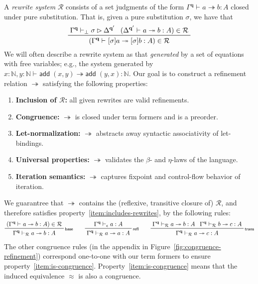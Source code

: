 \documentclass[acmsmall,screen,review]{acmart}
\newcommand{\mc}[1]{\ensuremath{\mathcal{#1}}}
\newcommand{\mb}[1]{\ensuremath{\mathbf{#1}}}
\newcommand{\ms}[1]{\ensuremath{\mathsf{#1}}}
\newcommand{\nats}{\mathbb{N}}
\newcommand{\rle}[1]{{\scriptsize\textsf{#1}}}
\newcommand{\hasty}[4]{#1 \vdash_{#2} #3: {#4}}
\newcommand{\issubst}[4]{#1 \vdash_{#2} #3 \rhd #4}
\newcommand{\tref}{\twoheadrightarrow}
\newcommand{\tmle}[5]{#1 \vdash_{#2} #3 \tref #4 : {#5}}
\begin{document}
A \emph{rewrite system} $\mc{R}$ consists of a set judgments of the form
$\tmle{\Gamma^{\mb{q}}}{}{a}{b}{A}$ closed under pure substitution. That is, given a pure
substitution $\sigma$, we have that
\begin{equation*}
  \prftree[r]{}
    {\issubst{\Gamma^{\mb{q}}}{\bot}{\sigma}{\Delta^{\mb{q}'}}}
    {(\tmle{\Delta^{\mb{q}'}}{}{a}{b}{A}) \in \mc{R}}
    {(\tmle{\Gamma^{\mb{q}}}{}{[\sigma]a}{[\sigma]b}{A}) \in \mc{R}} 
\end{equation*}
We will often describe a rewrite system as that \emph{generated} by a set of equations with free
variables; e.g., the system generated by $\tmle{x : \nats, y : \nats}{}{\ms{add}\;(x,
y)}{\ms{add}\;(y, x)}{\nats}$. Our goal is to construct a refinement relation $\tref$ satisfying the following properties: 
\begin{enumerate}
  \item \textbf{Inclusion of $\mc{R}$:} all given rewrites are valid refinements.
  \label{item:includes-rewrites}
  \item \textbf{Congruence:} $\tref$ is closed under term formers and is a preorder.
  \label{item:is-congruence}
  \item \textbf{Let-normalization:} $\tref$ abstracts away syntactic associativity of let-bindings.
  \label{item:abstracts-syntax}
  \item \textbf{Universal properties:} $\tref$ validates the $\beta$- and $\eta$-laws of the
  language. %
  \label{item:does-computation}
  \item \textbf{Iteration semantics:} $\tref$ captures fixpoint and control-flow behavior of
  iteration.
  \label{item:does-iteration}
\end{enumerate}
We guarantree that $\tref$ contains the (reflexive, transitive closure of) $\mc{R}$, and therefore
satisfies property~\ref{item:includes-rewrites}, by the following rules:
\begin{gather*}
  \prftree[r]{\rle{base}}
    {(\tmle{\Gamma^{\mb{q}}}{}{a}{b}{A}) \in \mc{R}}
    {\tmle{\Gamma^{\mb{q}}}{\mc{R}}{a}{b}{A}} \qquad
  \prftree[r]{\rle{refl}}
    {\hasty{\Gamma^{\mb{q}}}{\epsilon}{a}{A}}
    {\tmle{\Gamma^{\mb{q}}}{\mc{R}}{a}{a}{A}}
  \qquad
  \prftree[r]{\rle{trans}}
    {\tmle{\Gamma^{\mb{q}}}{\mc{R}}{a}{b}{A}}
    {\tmle{\Gamma^{\mb{q}}}{\mc{R}}{b}{c}{A}}
    {\tmle{\Gamma^{\mb{q}}}{\mc{R}}{a}{c}{A}}
\end{gather*}
The other congruence rules (in the appendix in Figure~\ref{fig:congruence-refinement})
correspond one-to-one with our term formers to ensure property~\ref{item:is-congruence}. Property~\ref{item:is-congruence} means that the induced equivalence $\approx$ is also a congruence.
\end{document}
